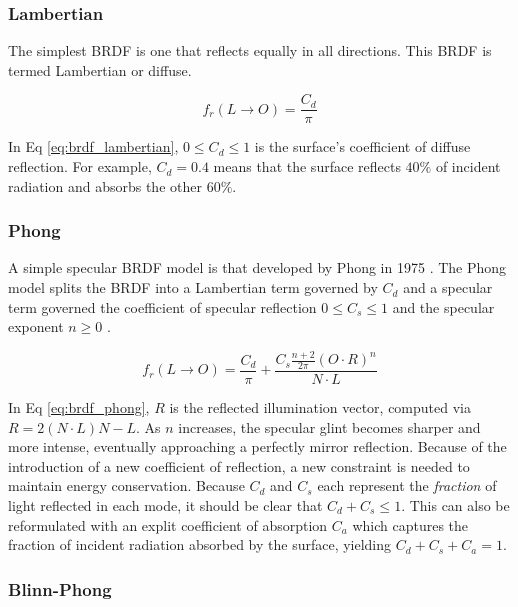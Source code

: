 \subsubsection{Lambertian}

The simplest BRDF is one that reflects equally in all directions. This BRDF is termed Lambertian or diffuse.

\begin{equation} \label{eq:brdf_lambertian}
  f_r(L \rightarrow O) = \frac{C_d}{\pi}
\end{equation}

In Eq \ref{eq:brdf_lambertian}, $0 \leq C_d \leq 1$ is the surface's coefficient of diffuse reflection. For example, $C_d = 0.4$ means that the surface reflects $40\%$ of incident radiation and absorbs the other $60\%$. 

\subsubsection{Phong}

A simple specular BRDF model is that developed by Phong in 1975 \cite{phong1975}. The Phong model splits the BRDF into a Lambertian term governed by $C_d$ and a specular term governed the coefficient of specular reflection $ 0 \leq C_s \leq 1$ and the specular exponent $n \geq 0$ \cite{duvenhage2013}. 

\begin{equation} \label{eq:brdf_phong}
  f_r(L \rightarrow O) = \frac{C_d}{\pi} + \frac{C_s \frac{n+2}{2\pi} (O \cdot R)^n}{N \cdot L}
\end{equation}

In Eq \ref{eq:brdf_phong}, $R$ is the reflected illumination vector, computed via $R = 2 (N \cdot L) N - L$. As $n$ increases, the specular glint becomes sharper and more intense, eventually approaching a perfectly mirror reflection. Because of the introduction of a new coefficient of reflection, a new constraint is needed to maintain energy conservation. Because $C_d$ and $C_s$ each represent the \textit{fraction} of light reflected in each mode, it should be clear that $C_d + C_s \leq 1$. This can also be reformulated with an explit coefficient of absorption $C_a$ which captures the fraction of incident radiation absorbed by the surface, yielding $C_d + C_s + C_a = 1$. 

\subsubsection{Blinn-Phong}

